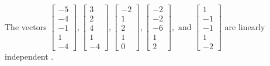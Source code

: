 \begin{exercise}
\begin{exerciseStatement}
  \end{exerciseStatement}
  \begin{exerciseAnswer}
   The vectors \(\left[\begin{array}{r}
-5 \\
-4 \\
-1 \\
1 \\
-4
\end{array}\right] , \left[\begin{array}{r}
3 \\
2 \\
4 \\
1 \\
-4
\end{array}\right] , \left[\begin{array}{r}
-2 \\
1 \\
2 \\
1 \\
0
\end{array}\right] , \left[\begin{array}{r}
-2 \\
-2 \\
-6 \\
1 \\
2
\end{array}\right] , \text{ and } \left[\begin{array}{r}
1 \\
-1 \\
-1 \\
1 \\
-2
\end{array}\right]\) are 
  	 linearly independent  .
  


  \end{exerciseAnswer}
\end{exercise}